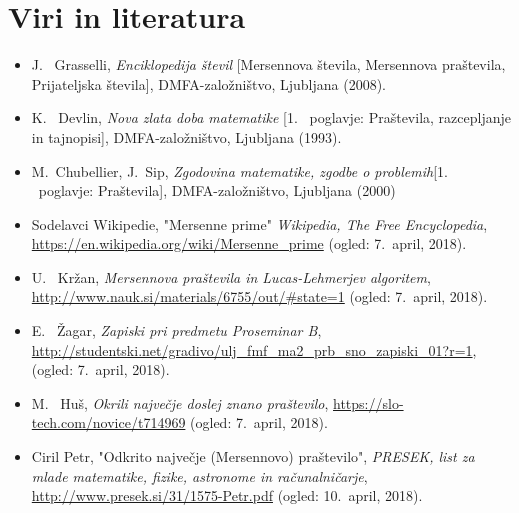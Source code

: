 \documentclass[12pt]{article}
\begin{document}
\section{Viri in literatura}
\begin{itemize}
\item
J. \ Grasselli, {\em Enciklopedija števil} [Mersennova števila, Mersennova praštevila, Prijateljska števila], DMFA-založništvo, Ljubljana (2008).
\item
K. \ Devlin, {\em Nova zlata doba matematike} [1. \ poglavje: Praštevila, razcepljanje in tajnopisi], DMFA-založništvo, Ljubljana (1993).
\item
M.\ Chubellier, J.\ Sip, {\em Zgodovina matematike, zgodbe o problemih}[1. \ poglavje: Praštevila], DMFA-založništvo, Ljubljana (2000)
\item
Sodelavci Wikipedie, "Mersenne prime" {\em Wikipedia, The Free Encyclopedia}, \url{https://en.wikipedia.org/wiki/Mersenne_prime} (ogled: 7.~april, 2018).
\item
U. \ Kržan, {\em Mersennova praštevila in Lucas-Lehmerjev algoritem}, \url{http://www.nauk.si/materials/6755/out/#state=1} (ogled: 7.~april, 2018).
\item
E. \ Žagar, {\em Zapiski pri predmetu Proseminar B}, \url{http://studentski.net/gradivo/ulj_fmf_ma2_prb_sno_zapiski_01?r=1}, (ogled: 7.~april, 2018).
\item
M. \ Huš, {\em Okrili največje doslej znano praštevilo}, \url{https://slo-tech.com/novice/t714969} (ogled: 7.~april, 2018).
\item
Ciril Petr, "Odkrito največje (Mersennovo) praštevilo", {\em PRESEK, list za mlade matematike, fizike, astronome in računalničarje}, \url{http://www.presek.si/31/1575-Petr.pdf} (ogled: 10.~april, 2018).

\end{itemize}
\end{document}
